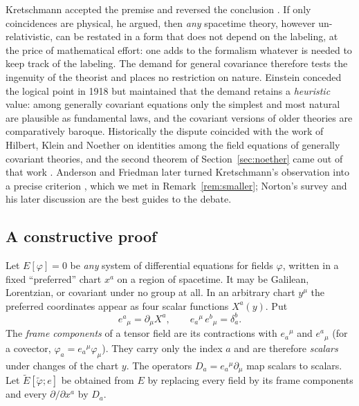 \documentclass[11pt,a4paper,openany]{book}
\theoremstyle{definition}
\theoremstyle{plain}
\theoremstyle{remark}
\begin{document}
Kretschmann accepted the premise and reversed the conclusion
\cite{kretschmann}. If only coincidences are physical, he argued, then
\emph{any} spacetime theory, however un-relativistic, can be restated in a form
that does not depend on the labeling, at the price of mathematical effort: one
adds to the formalism whatever is needed to keep track of the labeling. The
demand for general covariance therefore tests the ingenuity of the theorist and
places no restriction on nature. Einstein conceded the logical point in 1918
\cite{einstein1918} but maintained that the demand retains a \emph{heuristic}
value: among generally covariant equations only the simplest and most natural
are plausible as fundamental laws, and the covariant versions of older theories
are comparatively baroque. Historically the dispute coincided with the work of
Hilbert, Klein and Noether on identities among the field equations of
generally covariant theories, and the second theorem of
Section~\ref{sec:noether} came out of that work \cite{ks}. Anderson and
Friedman later turned Kretschmann's observation into a precise criterion
\cite{anderson,friedman}, which we met in Remark~\ref{rem:smaller}; Norton's
survey \cite{norton} and his later discussion \cite{bc} are the best guides to
the debate.

\subsection{A constructive proof}

Let $E[\varphi]=0$ be \emph{any} system of differential equations for fields
$\varphi$, written in a fixed ``preferred'' chart $x^a$ on a region of
spacetime. It may be Galilean, Lorentzian, or covariant under no group at all.
In an arbitrary chart $y^\mu$ the preferred coordinates appear as four scalar
functions $X^a(y)$. Put
\begin{equation}\label{eq:soldering}
  e^a{}_\mu=\partial_\mu X^a,\qquad
  e_a{}^\mu\,e^b{}_\mu=\delta_a^b .
\end{equation}
The \emph{frame components} of a tensor field are its contractions with
$e_a{}^\mu$ and $e^a{}_\mu$ (for a covector, $\varphi_a=e_a{}^\mu\varphi_\mu$).
They carry only the index $a$ and are therefore \emph{scalars} under changes
of the chart $y$. The operators $D_a=e_a{}^\mu\partial_\mu$ map scalars to
scalars. Let $\tilde E[\tilde\varphi;e]$ be obtained from $E$ by replacing every
field by its frame components and every $\partial/\partial x^a$ by $D_a$.
\end{document}
